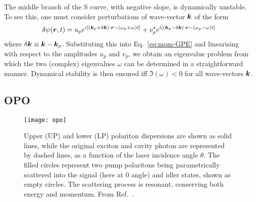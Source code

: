The middle branch of the S curve, with negative slope, is dynamically
unstable. To see this, one must consider perturbations of wave-vector
$\bm{k}$ of the form
%
\begin{equation}\label{eq:pump-fluctuations}
  \delta \psi(\bm{r},t) =  u_p e^{i [(\bm{k}_p + \delta\bm{k}) \cdot \bm{r} - (\omega_p + \omega) t ]}  + v_p^{\star}e^{i[ (\bm{k}_p - \delta\bm{k}) \cdot \bm{r}- (\omega_p - \omega) t]}
\end{equation}
% 
where $\delta\bm{k} \equiv \bm{k} - \bm{k}_p$. Substituting this into
Eq.~\eqref{eq:mom-GPE} and linearising with respect to the amplitudes
$u_p$ and $v_p$, we obtain an eigenvalue problem from which the two
(complex) eigenvalues $\omega$ can be determined in a straightforward
manner. Dynamical stability is then ensured iff $\Im(\omega) < 0$ for
all wave-vectors $\bm{k}$.








\subsection{OPO}
\label{subsec:opo}


%
\begin{figure}[tb]\centering
  \texttt{[image: opo]}
  \caption{
    Upper (UP) and lower (LP) polariton dispersions are shown as solid lines, while the original exciton and cavity photon are represented by dashed lines, as a function of the laser incidence angle $\theta$. The filled circles represent two pump polaritons being parametrically scattered into the signal (here at 0 angle) and idler states, shown as empty circles. The scattering process is resonant, conserving both energy and momentum. From Ref.~\cite{Ciuti_2003}.
  }\label{fig:parametric-scattering}
\end{figure}
% 

